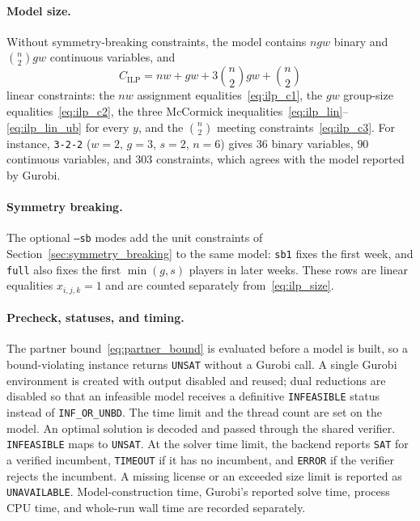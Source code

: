 \documentclass[a4paper,fleqn]{cas-sc}
\begin{document}
\paragraph{Model size.} Without symmetry-breaking constraints, the model contains $ngw$ binary and $\binom{n}{2}gw$ continuous variables, and
\begin{equation}
    C_{\mathrm{ILP}} = nw + gw + 3\binom{n}{2}gw + \binom{n}{2}
    \label{eq:ilp_size}
\end{equation}
linear constraints: the $nw$ assignment equalities~\eqref{eq:ilp_c1}, the $gw$ group-size equalities~\eqref{eq:ilp_c2}, the three McCormick inequalities~\eqref{eq:ilp_lin}--\eqref{eq:ilp_lin_ub} for every $y$, and the $\binom{n}{2}$ meeting constraints~\eqref{eq:ilp_c3}. For instance, \texttt{3-2-2} ($w=2$, $g=3$, $s=2$, $n=6$) gives $36$ binary variables, $90$ continuous variables, and $303$ constraints, which agrees with the model reported by Gurobi.

\paragraph{Symmetry breaking.} The optional \texttt{--sb} modes add the unit constraints of Section~\ref{sec:symmetry_breaking} to the same model: \texttt{sb1} fixes the first week, and \texttt{full} also fixes the first $\min(g,s)$ players in later weeks. These rows are linear equalities $x_{i,j,k}=1$ and are counted separately from~\eqref{eq:ilp_size}.

\paragraph{Precheck, statuses, and timing.} The partner bound~\eqref{eq:partner_bound} is evaluated before a model is built, so a bound-violating instance returns \texttt{UNSAT} without a Gurobi call. A single Gurobi environment is created with output disabled and reused; dual reductions are disabled so that an infeasible model receives a definitive \texttt{INFEASIBLE} status instead of \texttt{INF\_OR\_UNBD}. The time limit and the thread count are set on the model. An optimal solution is decoded and passed through the shared verifier. \texttt{INFEASIBLE} maps to \texttt{UNSAT}. At the solver time limit, the
backend reports \texttt{SAT} for a verified incumbent, \texttt{TIMEOUT} if it
has no incumbent, and \texttt{ERROR} if the verifier rejects the incumbent.
A missing license or an exceeded size limit is reported as \texttt{UNAVAILABLE}. Model-construction time, Gurobi's reported solve time, process CPU time, and whole-run wall time are recorded separately.
\end{document}
